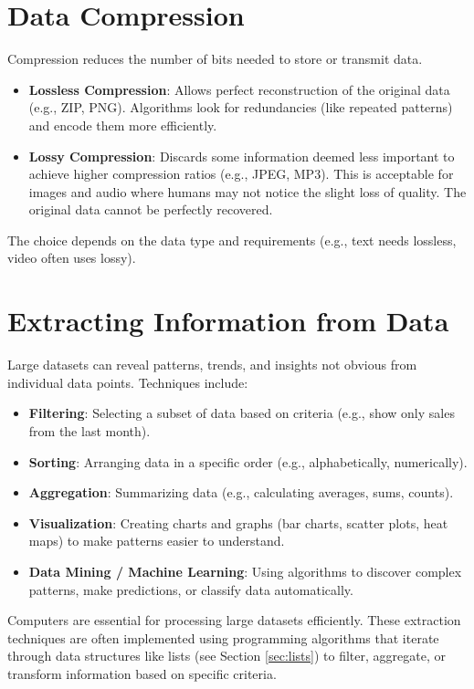 \documentclass[11pt,oneside]{book}
\begin{document}
\section{Data Compression}
\label{sec:data_compression}
Compression reduces the number of bits needed to store or transmit data.
\begin{itemize}
    \item \textbf{Lossless Compression}: Allows perfect reconstruction of the original data (e.g., ZIP, PNG). Algorithms look for redundancies (like repeated patterns) and encode them more efficiently.
    \item \textbf{Lossy Compression}: Discards some information deemed less important to achieve higher compression ratios (e.g., JPEG, MP3). This is acceptable for images and audio where humans may not notice the slight loss of quality. The original data cannot be perfectly recovered.
\end{itemize}
The choice depends on the data type and requirements (e.g., text needs lossless, video often uses lossy).

\section{Extracting Information from Data}
\label{sec:extracting_info}
Large datasets can reveal patterns, trends, and insights not obvious from individual data points. Techniques include:
\begin{itemize}
    \item \textbf{Filtering}: Selecting a subset of data based on criteria (e.g., show only sales from the last month).
    \item \textbf{Sorting}: Arranging data in a specific order (e.g., alphabetically, numerically).
    \item \textbf{Aggregation}: Summarizing data (e.g., calculating averages, sums, counts).
    \item \textbf{Visualization}: Creating charts and graphs (bar charts, scatter plots, heat maps) to make patterns easier to understand.
    \item \textbf{Data Mining / Machine Learning}: Using algorithms to discover complex patterns, make predictions, or classify data automatically.
\end{itemize}
Computers are essential for processing large datasets efficiently. These extraction techniques are often implemented using programming algorithms that iterate through data structures like lists (see Section \ref{sec:lists}) to filter, aggregate, or transform information based on specific criteria.
\end{document}
